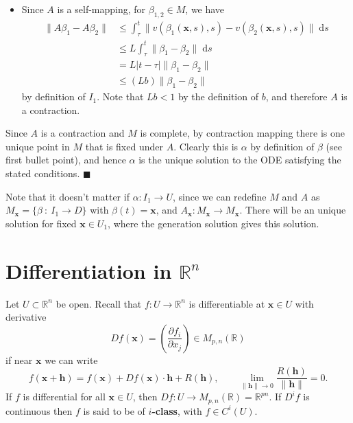 \documentclass[letter-paper]{tufte-book}
\newenvironment{proof}[1][Proof]{\begin{trivlist}
\item[\hskip \labelsep {\bfseries #1}]}{\end{trivlist}}
\newcommand{\qed}{\hfill$\blacksquare$}
\begin{document}
\begin{proof}
\begin{itemize}
    \item Since $A$ is a self-mapping, for $\beta_{1,2} \in M$, we have
    \begin{align*}
      \|A\beta_1 - A\beta_2\| &\leq \int_\tau^t \|v(\beta_1(\boldsymbol{x}, s), s) - v(\beta_2(\boldsymbol{x}, s), s) \|\; \mathrm{d}s \\
        &\leq L \int_\tau^t \|\beta_1 - \beta_2\|\; \mathrm{d}s\\
        &= L |t - \tau| \|\beta_1 - \beta_2\|\\
        &\leq (Lb) \|\beta_1 - \beta_2\|
    \end{align*}
    by definition of $I_1$. Note that $Lb < 1$ by the definition of
    $b$, and therefore $A$ is a contraction.
  \end{itemize}
  Since $A$ is a contraction and $M$ is complete, by contraction mapping there
  is one unique point in $M$ that is fixed under $A$. Clearly this is $\alpha$
  by definition of $\beta$ (see first bullet point), and hence $\alpha$ is the
  unique solution to the ODE satisfying the stated conditions. \qed
\end{proof}

Note that it doesn't matter if $\alpha : I_1 \to U$, since we can redefine $M$
and $A$ as $M_{\boldsymbol{x}} = \{\beta\ :\ I_1 \to D\}$ with $\beta(t) =
\boldsymbol{x}$, and $A_{\boldsymbol{x}} : M_{\boldsymbol{x}} \to
M_{\boldsymbol{x}}$. There will be an unique solution for fixed $\boldsymbol{x}
\in U_1$, where the generation solution gives this solution.


\section{Differentiation in $\mathbb{R}^n$}

Let $U \subset \mathbb{R}^n$ be open. Recall that $f : U \to \mathbb{R}^n$ is differentiable at $\boldsymbol{x} \in U$ with derivative
\begin{equation}
  Df(\boldsymbol{x}) = \left(\frac{\partial f_i}{\partial x_j}\right) \in M_{p,n}(\mathbb{R})
\end{equation}
if near $\boldsymbol{x}$ we can write
\begin{equation*}
  f(\boldsymbol{x} + \boldsymbol{h}) = f(\boldsymbol{x}) + Df(\boldsymbol{x}) \cdot \boldsymbol{h} + R(\boldsymbol{h}), \qquad \lim_{\|\boldsymbol{h}\|\to 0} \frac{R(\boldsymbol{h})}{\|\boldsymbol{h}\|} = 0.
\end{equation*}
If $f$ is differential for all $\boldsymbol{x} \in U$, then $Df : U \to M_{p,
n}(\mathbb{R}) = \mathbb{R}^{pn}$. If $D^i f$ is continuous then $f$ is said to
be of \textbf{$i$-class}, with $f \in C^i (U)$.
\end{document}
